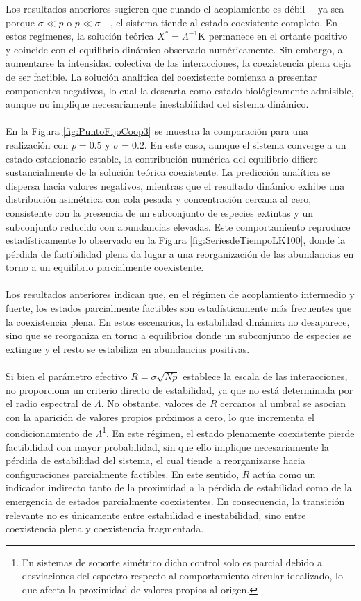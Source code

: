 Los resultados anteriores sugieren que cuando el acoplamiento es débil ---ya sea porque $\sigma\ll p$ o $p\ll\sigma$---, el sistema tiende al estado coexistente completo. En estos regímenes, la solución teórica $X^*=\Lambda^{-1}\mathrm{K}$ permanece en el ortante positivo y coincide con el equilibrio dinámico observado numéricamente. Sin embargo, al aumentarse la intensidad colectiva de las interacciones, la coexistencia plena deja de ser factible. La solución analítica del coexistente comienza a presentar componentes negativos, lo cual la descarta como estado biológicamente admisible, aunque no implique necesariamente inestabilidad del sistema dinámico. \\
\\
En la Figura \eqref{fig:PuntoFijoCoop3} se muestra la comparación para una realización con $p=0.5$ y $\sigma=0.2$. En este caso, aunque el sistema converge a un estado estacionario estable, la contribución numérica del equilibrio difiere sustancialmente de la solución teórica coexistente. La predicción analítica se dispersa hacia valores negativos, mientras que el resultado dinámico exhibe una distribución asimétrica con cola pesada y concentración cercana al cero, consistente con la presencia de un subconjunto de especies extintas y un subconjunto reducido con abundancias elevadas. Este comportamiento reproduce estadísticamente lo observado en la Figura \eqref{fig:SeriesdeTiempoLK100}, donde la pérdida de factibilidad plena da lugar a una reorganización de las abundancias en torno a un equilibrio parcialmente coexistente.
\\
\\
Los resultados anteriores indican que, en el régimen de acoplamiento intermedio y fuerte, los estados parcialmente factibles son estadísticamente más frecuentes que la coexistencia plena. En estos escenarios, la estabilidad dinámica no desaparece, sino que se reorganiza en torno a equilibrios donde un subconjunto de especies se extingue y el resto se estabiliza en abundancias positivas.
\\
\\
Si bien el parámetro efectivo $R=\sigma\sqrt{Np}$ establece la escala de las interacciones, no proporciona un criterio directo de estabilidad, ya que no está determinada por el radio espectral de $\Lambda$. No obstante, valores de $R$ cercanos al umbral se asocian con la aparición de valores propios próximos a cero, lo que incrementa el condicionamiento de $\Lambda$\footnote{En sistemas de soporte simétrico dicho control solo es parcial debido a desviaciones del espectro respecto al comportamiento circular idealizado, lo que afecta la proximidad de valores propios al origen.}. En este régimen, el estado plenamente coexistente pierde factibilidad con mayor probabilidad, sin que ello implique necesariamente la pérdida de estabilidad del sistema, el cual tiende a reorganizarse hacia configuraciones parcialmente factibles. En este sentido, $R$ actúa como un indicador indirecto tanto de la proximidad a la pérdida de estabilidad como de la emergencia de estados parcialmente coexistentes. En consecuencia, la transición relevante no es únicamente entre estabilidad e inestabilidad, sino entre coexistencia plena y coexistencia fragmentada.
